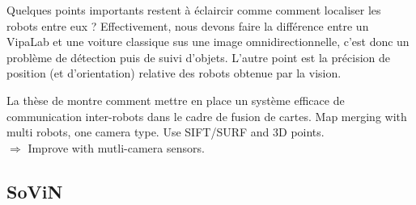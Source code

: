 Quelques points importants restent à éclaircir comme comment localiser les robots entre eux ?
Effectivement, nous devons faire la différence entre un VipaLab et une voiture classique sus une image omnidirectionnelle, c'est donc un problème de détection puis de suivi d'objets.
L'autre point est la précision de position (et d'orientation) relative des robots obtenue par la vision.





La thèse de \citeauthor{Aragues11PhD} \cite{Aragues11PhD} montre comment mettre en place un système efficace de communication inter-robots dans le cadre de fusion de cartes.
Map merging with multi robots, one camera type. Use SIFT/SURF and 3D points.\\
$\Rightarrow$ Improve with mutli-camera sensors. 



\subsection{SoViN}
\label{subsub:sovin}

